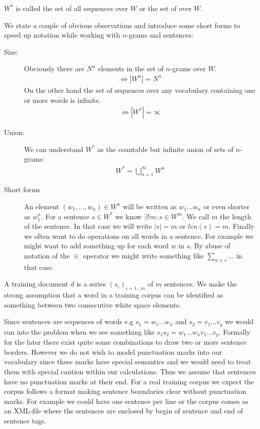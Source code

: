 \documentclass[•]{book}
\begin{document}
\begin{definition}
$W^{*}$ is called the set of all sequences over $W$ or the set of  over $W$.
\end{definition}

\begin{remark}
We state a couple of obvious observations and introduce some short forms to speed up notation while working with $n$-grams and sentences:
\begin{description}
\item[Size:] Obviously there are $N^n$ elements in the set of $n$-grams over $W$.
\begin{align}
\Leftrightarrow|W^{n}|=N^n
\end{align}
On the other hand the set of sequences over any vocabulary containing one or more words is infinite.
\begin{align}
\Leftrightarrow |W^{*}|=\infty
\end{align}
\item[Union:] We can understand $W^{*}$ as the countable but infinite union of sets of $n$-grams:
\begin{align}
W^{*}=\bigcup_{n=1}^\infty W^n
\end{align}
\item[Short forms] An element $(w_1,\dots,w_n) \in W^n$ will be written as $w_1\dots w_n$ or even shorter as $w_1^n$. For a sentence $s\in W^{*}$ we know $\exists ! m : s\in W^m$. We call $m$ the length of the sentence. In that case we will write $|s|=m$ or $len(s)=m$. Finally we often want to do operations on all words in a sentence. For example we might want to add something up for each word $w$ in $s$. By abuse of notation of the $\in$ operator we might write something like $\sum\limits_{w\in s}\dots$ in that case.
\end{description}
\end{remark}

\begin{definition}
A training \gls{document} $d$ is a series $(s_i)_{i=1\dots m}$ of $m$ sentences. We make the strong assumption that a word in a training corpus can be identified as something between two consecutive white space elements. 
\end{definition}

\begin{remark}
Since sentences are sequences of words e.g $s_1=w_1\dots w_x$ and $s_2=v_1\dots v_y$ we would run into the problem when we see something like $s_1s_2=w_1\dots w_xv_1\dots v_y$. 
Formally for the later there exist quite some combinations to draw two or more sentence borders.
However we do not wish to model punctuation marks into our vocabulary since these marks have special semantics and we would need to treat them with special caution within our calculations. 
Thus we assume that sentences have no punctuation marks at their end.
For a real training corpus we expect the corpus follows a format making sentence boundaries clear without punctuation marks.
For example we could have one sentence per line or the corpus comes as an XML-file where the sentences are enclosed by begin of sentence and end of sentence tags. 
\end{remark}
\end{document}
